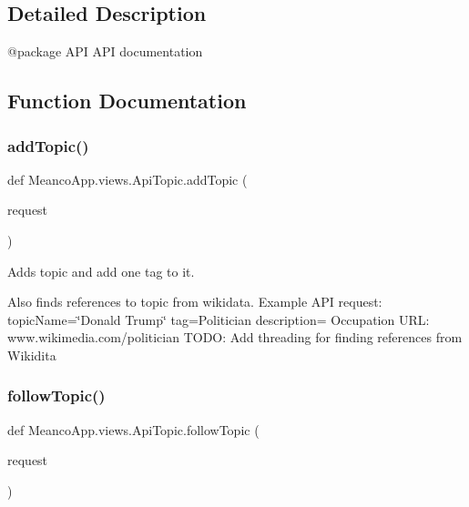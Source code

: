 \subsection{Detailed Description}
\begin{DoxyVerb}@package API
API documentation\end{DoxyVerb}
 

\subsection{Function Documentation}
\hypertarget{namespace_meanco_app_1_1views_1_1_api_topic_a049cfbca71b779e10b7142025467e143}{}\label{namespace_meanco_app_1_1views_1_1_api_topic_a049cfbca71b779e10b7142025467e143} 
\subsubsection{\texorpdfstring{add\+Topic()}{addTopic()}}
{\footnotesize\ttfamily def Meanco\+App.\+views.\+Api\+Topic.\+add\+Topic (\begin{DoxyParamCaption}\item[{}]{request }\end{DoxyParamCaption})}



Adds topic and add one tag to it. 

Also finds references to topic from wikidata. Example A\+PI request\+: topic\+Name=\char`\"{}\+Donald Trump\char`\"{} tag=Politician description= Occupation U\+RL\+: www.\+wikimedia.\+com/politician T\+O\+DO\+: Add threading for finding references from Wikidita \hypertarget{namespace_meanco_app_1_1views_1_1_api_topic_aceb28924ab008fbaa70b78d1b2258d5e}{}\label{namespace_meanco_app_1_1views_1_1_api_topic_aceb28924ab008fbaa70b78d1b2258d5e} 
\subsubsection{\texorpdfstring{follow\+Topic()}{followTopic()}}
{\footnotesize\ttfamily def Meanco\+App.\+views.\+Api\+Topic.\+follow\+Topic (\begin{DoxyParamCaption}\item[{}]{request }\end{DoxyParamCaption})}



